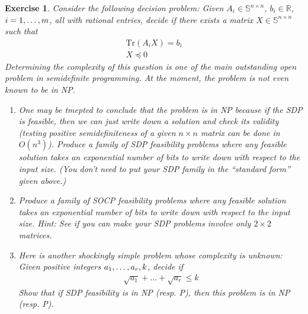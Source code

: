 \documentclass[12pt]{article}
\theoremstyle{colon}
\newtheorem{exercise}{Exercise}
\begin{document}
\clearpage

\begin{exercise}
  Consider the following decision problem: Given $A_i \in \mathbb{S}^{n \times n}$, $b_i \in \mathbb{R}$, $i = 1, \mathellipsis, m$, all with rational entries, decide if there exists a matrix $X \in \mathbb{S}^{n \times n}$ such that
  \begin{gather*}
    \text{Tr}(A_i X) = b_i \\
    X \preceq 0
  \end{gather*}
  Determining the complexity of this question is one of the main outstanding open problem in semidefinite programming. At the moment, the problem is not even known to be in NP.
  \begin{enumerate}[label=\arabic*)]
    \item One may be tmepted to conclude that the problem is in NP because if the SDP is feasible, then we can just write down a solution and check its validity (testing positive semidefiniteness of a given $n \times n$ matrix can be done in $O(n^3)$). Produce a family of SDP feasibility problems where any feasible solution takes an exponential number of bits to write down with respect to the input size. (You don't need to put your SDP family in the ``standard form'' given above.)
    \item Produce a family of SOCP feasibility problems where any feasible solution takes an exponential number of bits to write down with respect to the input size. \textit{Hint: See if you can make your SDP problems involve only $2 \times 2$ matrices.}
    \item Here is another shockingly simple problem whose complexity is unknown: Given positive integers $a_1, \mathellipsis, a_r, k$, decide if
      \begin{gather*}
        \sqrt{a_1} + \dots + \sqrt{a_r} \leq k
      \end{gather*}
      Show that if SDP feasibility is in NP (resp. P), then this problem is in NP (resp. P).
  \end{enumerate}
\end{exercise}
\end{document}

